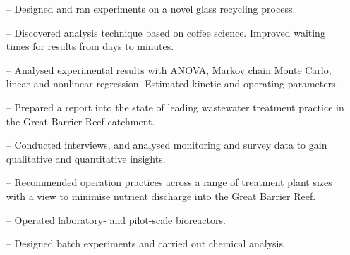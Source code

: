 \documentclass[10pt,a4paper]{altacv}
\begin{document}
\begin{itemize}
    \setlength{\itemindent}{0.3em}
    \item[--]   \small{Designed and ran experiments on a novel glass 
    recycling process.}
    \item[--]   \small{Discovered analysis technique based on 
    coffee science. Improved waiting times for results from days to minutes.}
    \item[--]   \small{Analysed experimental results with ANOVA, Markov chain Monte
    Carlo, linear and nonlinear regression. Estimated kinetic and operating parameters.}
\end{itemize}
\divider\smallskip

\begin{itemize}
    \setlength{\itemindent}{0.3em}
    \item[--]   \small{Prepared a report into the state of leading 
    wastewater treatment practice in the Great Barrier Reef catchment.}
    \item[--]   \small{Conducted interviews, and analysed monitoring 
    and survey data to gain qualitative and quantitative insights.}
    \item[--]   \small{Recommended operation practices across a 
    range of treatment plant sizes with a view to minimise
    nutrient discharge into the Great Barrier Reef.}
\end{itemize}
\divider\smallskip


\begin{itemize}
    \setlength{\itemindent}{0.3em}
    \item[--]   \small{Operated laboratory- and pilot-scale bioreactors.}
    \item[--]   \small{Designed batch experiments and carried out chemical
    analysis.}
\end{itemize}

\divider\medskip

\newpage
\end{document}
